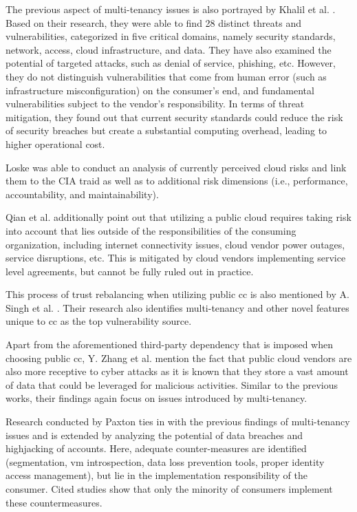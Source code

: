 The previous aspect of multi-tenancy issues is also portrayed by Khalil et al. \cite{Khalil2014}. Based on their research, they were able to find 28 distinct threats and vulnerabilities, categorized in five critical domains, namely security standards, network, access, cloud infrastructure, and data. They have also examined the potential of targeted attacks, such as denial of service, phishing, etc. However, they do not distinguish vulnerabilities that come from human error (such as infrastructure misconfiguration) on the consumer's end, and fundamental vulnerabilities subject to the vendor's responsibility. In terms of threat mitigation, they found out that current security standards could reduce the risk of security breaches but create a substantial computing overhead, leading to higher operational cost.

Loske \cite[p. 25]{Loske2015} was able to conduct an analysis of currently perceived cloud risks and link them to the CIA traid as well as to additional risk dimensions (i.e., performance, accountability, and maintainability). 

Qian et al. \cite{Qian2009} additionally point out that utilizing a public cloud requires taking risk into account that lies outside of the responsibilities of the consuming organization, including internet connectivity issues, cloud vendor power outages, service disruptions, etc. This is mitigated by cloud vendors implementing service level agreements, but cannot be fully ruled out in practice.

This process of trust rebalancing when utilizing public \ac{cc} is also mentioned by A. Singh et al. \cite{Singh2017}. Their research also identifies multi-tenancy and other novel features unique to \ac{cc} as the top vulnerability source.

Apart from the aforementioned third-party dependency that is imposed when choosing public \ac{cc}, Y. Zhang et al. \cite{Zhang2012} mention the fact that public cloud vendors are also more receptive to cyber attacks as it is known that they store a vast amount of data that could be leveraged for malicious activities. Similar to the previous works, their findings again focus on issues introduced by multi-tenancy.

Research conducted by Paxton \cite{Paxton2016} ties in with the previous findings of multi-tenancy issues and is extended by analyzing the potential of data breaches and highjacking of accounts. Here, adequate counter-measures are identified (segmentation, \ac{vm} introspection, data loss prevention tools, proper identity access management), but lie in the implementation responsibility of the consumer. Cited studies show that only the minority of consumers implement these countermeasures.

